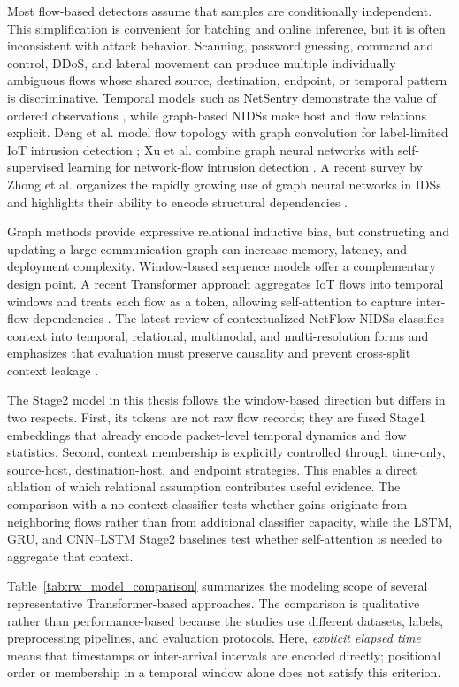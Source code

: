 \documentclass[11pt,fleqn]{report}
\begin{document}
Most flow-based detectors assume that samples are conditionally independent. This simplification is convenient for batching and online inference, but it is often inconsistent with attack behavior. Scanning, password guessing, command and control, DDoS, and lateral movement can produce multiple individually ambiguous flows whose shared source, destination, endpoint, or temporal pattern is discriminative. Temporal models such as NetSentry demonstrate the value of ordered observations \cite{LiuPatras2022NetSentry}, while graph-based NIDSs make host and flow relations explicit. Deng et al. model flow topology with graph convolution for label-limited IoT intrusion detection \cite{Deng2023FlowTopology}; Xu et al. combine graph neural networks with self-supervised learning for network-flow intrusion detection \cite{Xu2024SSLGNN}. A recent survey by Zhong et al. organizes the rapidly growing use of graph neural networks in IDSs and highlights their ability to encode structural dependencies \cite{Zhong2024GNNSurvey}.

Graph methods provide expressive relational inductive bias, but constructing and updating a large communication graph can increase memory, latency, and deployment complexity. Window-based sequence models offer a complementary design point. A recent Transformer approach aggregates IoT flows into temporal windows and treats each flow as a token, allowing self-attention to capture inter-flow dependencies \cite{MartinReizabal2026FlowWindow}. The latest review of contextualized NetFlow NIDSs classifies context into temporal, relational, multimodal, and multi-resolution forms and emphasizes that evaluation must preserve causality and prevent cross-split context leakage \cite{ElMahdaouy2026ContextNetFlow}.

The Stage2 model in this thesis follows the window-based direction but differs in two respects. First, its tokens are not raw flow records; they are fused Stage1 embeddings that already encode packet-level temporal dynamics and flow statistics. Second, context membership is explicitly controlled through time-only, source-host, destination-host, and endpoint strategies. This enables a direct ablation of which relational assumption contributes useful evidence. The comparison with a no-context classifier tests whether gains originate from neighboring flows rather than from additional classifier capacity, while the LSTM, GRU, and CNN--LSTM Stage2 baselines test whether self-attention is needed to aggregate that context.

Table~\ref{tab:rw_model_comparison} summarizes the modeling scope of several representative Transformer-based approaches. The comparison is qualitative rather than performance-based because the studies use different datasets, labels, preprocessing pipelines, and evaluation protocols. Here, \emph{explicit elapsed time} means that timestamps or inter-arrival intervals are encoded directly; positional order or membership in a temporal window alone does not satisfy this criterion.
\end{document}
